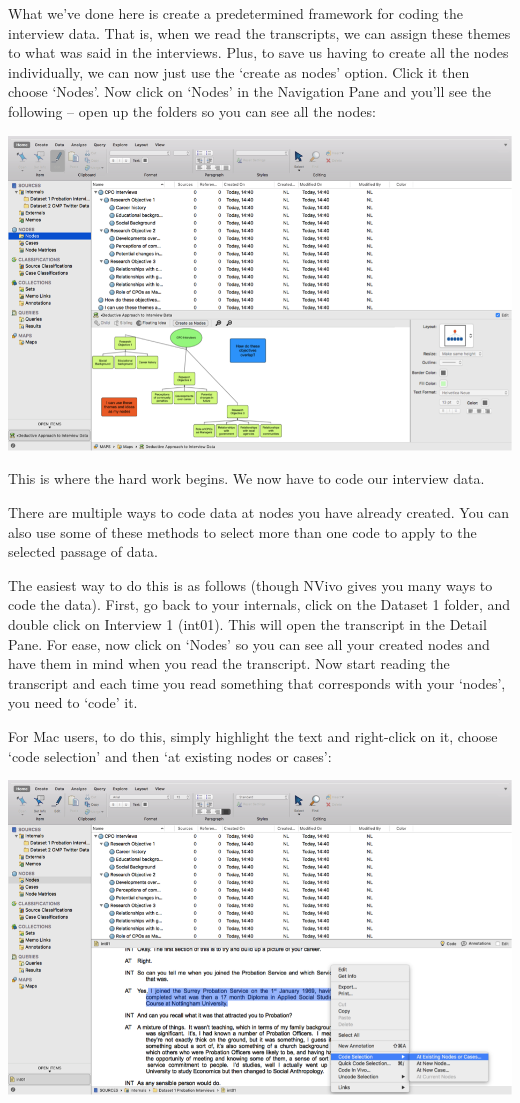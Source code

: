 \documentclass[]{book}
\theoremstyle{definition}
\theoremstyle{definition}
\theoremstyle{definition}
\theoremstyle{remark}
\begin{document}
What we've done here is create a predetermined framework for coding the
interview data. That is, when we read the transcripts, we can assign
these themes to what was said in the interviews. Plus, to save us having
to create all the nodes individually, we can now just use the `create as
nodes' option. Click it then choose `Nodes'. Now click on `Nodes' in the
Navigation Pane and you'll see the following -- open up the folders so
you can see all the nodes:

\includegraphics{imgs/qual_41.png}

This is where the hard work begins. We now have to code our interview
data.

There are multiple ways to code data at nodes you have already created.
You can also use some of these methods to select more than one code to
apply to the selected passage of data.

The easiest way to do this is as follows (though NVivo gives you many
ways to code the data). First, go back to your internals, click on the
Dataset 1 folder, and double click on Interview 1 (int01). This will
open the transcript in the Detail Pane. For ease, now click on `Nodes'
so you can see all your created nodes and have them in mind when you
read the transcript. Now start reading the transcript and each time you
read something that corresponds with your `nodes', you need to `code'
it.

For Mac users, to do this, simply highlight the text and right-click on
it, choose `code selection' and then `at existing nodes or cases':

\includegraphics{imgs/qual_42.png}
\end{document}

